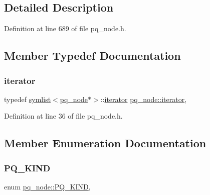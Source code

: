 \subsection{Detailed Description}


Definition at line 689 of file pq\+\_\+node.\+h.



\subsection{Member Typedef Documentation}
\mbox{\label{classpq__node_a34898c9eb1527787c07e8ebefd6bfba5}} 
\subsubsection{\texorpdfstring{iterator}{iterator}}
{\footnotesize\ttfamily typedef \mbox{\hyperlink{classsymlist}{symlist}}$<$\mbox{\hyperlink{classpq__node}{pq\+\_\+node}}$\ast$$>$\+::\mbox{\hyperlink{classpq__node_a34898c9eb1527787c07e8ebefd6bfba5}{iterator}} \mbox{\hyperlink{classpq__node_a34898c9eb1527787c07e8ebefd6bfba5}{pq\+\_\+node\+::iterator}}\hspace{0.3cm}{\ttfamily [protected]}, {\ttfamily [inherited]}}



Definition at line 36 of file pq\+\_\+node.\+h.



\subsection{Member Enumeration Documentation}
\mbox{\label{classpq__node_a96827bdca8bf81d20213405dd27f8fa6}} 
\subsubsection{\texorpdfstring{P\+Q\+\_\+\+K\+I\+ND}{PQ\_KIND}}
{\footnotesize\ttfamily enum \mbox{\hyperlink{classpq__node_a96827bdca8bf81d20213405dd27f8fa6}{pq\+\_\+node\+::\+P\+Q\+\_\+\+K\+I\+ND}}\hspace{0.3cm}{\ttfamily [protected]}, {\ttfamily [inherited]}}

